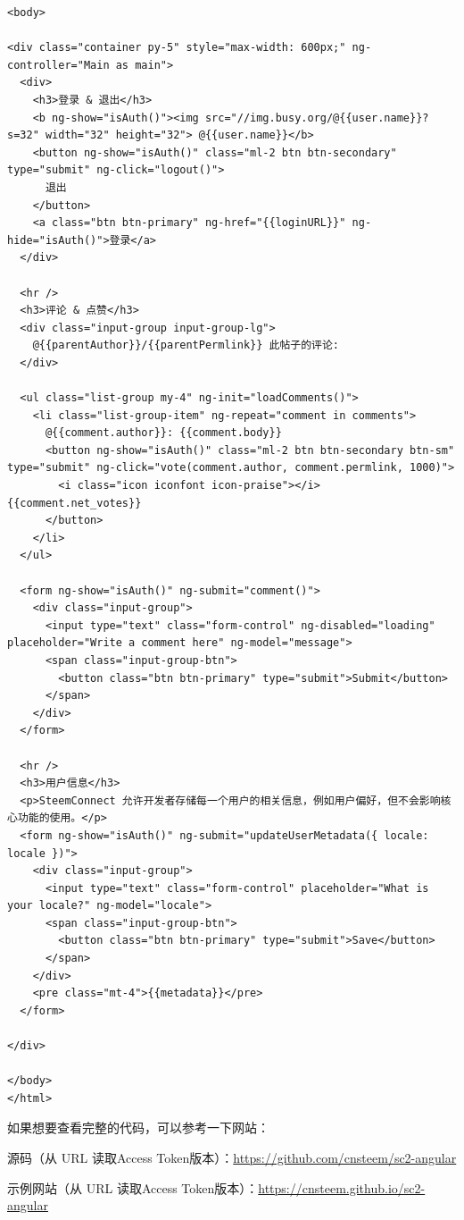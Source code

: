 \documentclass[]{ctexbook}
\begin{document}
\begin{itemize}
\begin{verbatim}
<body>

<div class="container py-5" style="max-width: 600px;" ng-controller="Main as main">
  <div>
    <h3>登录 & 退出</h3>
    <b ng-show="isAuth()"><img src="//img.busy.org/@{{user.name}}?s=32" width="32" height="32"> @{{user.name}}</b>
    <button ng-show="isAuth()" class="ml-2 btn btn-secondary" type="submit" ng-click="logout()">
      退出
    </button>
    <a class="btn btn-primary" ng-href="{{loginURL}}" ng-hide="isAuth()">登录</a>
  </div>

  <hr />
  <h3>评论 & 点赞</h3>
  <div class="input-group input-group-lg">
    @{{parentAuthor}}/{{parentPermlink}} 此帖子的评论: 
  </div>

  <ul class="list-group my-4" ng-init="loadComments()">
    <li class="list-group-item" ng-repeat="comment in comments">
      @{{comment.author}}: {{comment.body}}
      <button ng-show="isAuth()" class="ml-2 btn btn-secondary btn-sm" type="submit" ng-click="vote(comment.author, comment.permlink, 1000)">
        <i class="icon iconfont icon-praise"></i> {{comment.net_votes}}
      </button>
    </li>
  </ul>

  <form ng-show="isAuth()" ng-submit="comment()">
    <div class="input-group">
      <input type="text" class="form-control" ng-disabled="loading" placeholder="Write a comment here" ng-model="message">
      <span class="input-group-btn">
        <button class="btn btn-primary" type="submit">Submit</button>
      </span>
    </div>
  </form>

  <hr />
  <h3>用户信息</h3>
  <p>SteemConnect 允许开发者存储每一个用户的相关信息，例如用户偏好，但不会影响核心功能的使用。</p>
  <form ng-show="isAuth()" ng-submit="updateUserMetadata({ locale: locale })">
    <div class="input-group">
      <input type="text" class="form-control" placeholder="What is your locale?" ng-model="locale">
      <span class="input-group-btn">
        <button class="btn btn-primary" type="submit">Save</button>
      </span>
    </div>
    <pre class="mt-4">{{metadata}}</pre>
  </form>

</div>

</body>
</html>
\end{verbatim}
\end{itemize}

如果想要查看完整的代码，可以参考一下网站：

源码（从 URL 读取Access Token版本）：\url{https://github.com/cnsteem/sc2-angular}

示例网站（从 URL 读取Access Token版本）：\url{https://cnsteem.github.io/sc2-angular}
\end{document}
